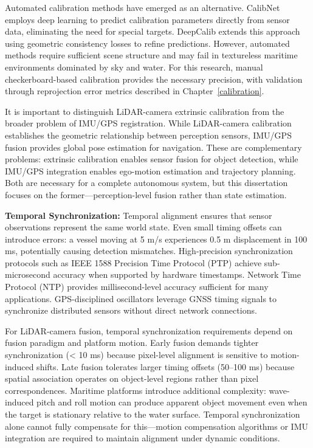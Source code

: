 \documentclass{erauthesis}
\begin{document}
Automated calibration methods have emerged as an alternative. CalibNet \cite{iyer2018} employs deep learning to predict calibration parameters directly from sensor data, eliminating the need for special targets. DeepCalib \cite{yuan2020} extends this approach using geometric consistency losses to refine predictions. However, automated methods require sufficient scene structure and may fail in textureless maritime environments dominated by sky and water. For this research, manual checkerboard-based calibration provides the necessary precision, with validation through reprojection error metrics described in Chapter~\ref{calibration}.

It is important to distinguish LiDAR-camera extrinsic calibration from the broader problem of IMU/GPS registration. While LiDAR-camera calibration establishes the geometric relationship between perception sensors, IMU/GPS fusion provides global pose estimation for navigation. These are complementary problems: extrinsic calibration enables sensor fusion for object detection, while IMU/GPS integration enables ego-motion estimation and trajectory planning. Both are necessary for a complete autonomous system, but this dissertation focuses on the former—perception-level fusion rather than state estimation.

\textbf{Temporal Synchronization:} Temporal alignment ensures that sensor observations represent the same world state. Even small timing offsets can introduce errors: a vessel moving at 5 m/s experiences 0.5 m displacement in 100 ms, potentially causing detection mismatches. High-precision synchronization protocols such as IEEE 1588 Precision Time Protocol (PTP) achieve sub-microsecond accuracy when supported by hardware timestamps. Network Time Protocol (NTP) provides millisecond-level accuracy sufficient for many applications. GPS-disciplined oscillators leverage GNSS timing signals to synchronize distributed sensors without direct network connections.

For LiDAR-camera fusion, temporal synchronization requirements depend on fusion paradigm and platform motion. Early fusion demands tighter synchronization (< 10 ms) because pixel-level alignment is sensitive to motion-induced shifts. Late fusion tolerates larger timing offsets (50–100 ms) because spatial association operates on object-level regions rather than pixel correspondences. Maritime platforms introduce additional complexity: wave-induced pitch and roll motion can produce apparent object movement even when the target is stationary relative to the water surface. Temporal synchronization alone cannot fully compensate for this—motion compensation algorithms or IMU integration are required to maintain alignment under dynamic conditions.
\end{document}
